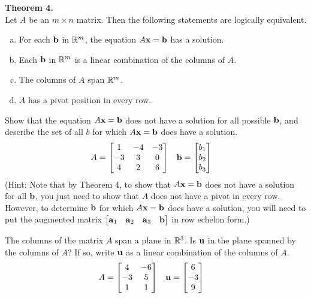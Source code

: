 \newpage


\begin{boxthm}
	\textbf{Theorem 4.} \\
	Let $A$ be an $m\times n$ matrix. Then the following statements are logically equivalent.
	\begin{enumerate}[(a)]\itemsep0em 
		\item For each $\boldsymbol{\mathbf{b}}$ in $\mathbb{R}^m$, the equation $A\boldsymbol{\mathbf{x}}=\boldsymbol{\mathbf{b}}$ has a solution.
		\item Each $\boldsymbol{\mathbf{b}}$ in $\mathbb{R}^m$ is a linear combination of the columns of $A$.
		\item The columns of $A$ span $\mathbb{R}^m$.
		\item $A$ has a pivot position in every row.
	\end{enumerate}
\end{boxthm}

\begin{exercise} %
	Show that the equation $A\boldsymbol{\mathbf{x}}=\boldsymbol{\mathbf{b}}$ does not have a solution for all possible $\boldsymbol{\mathbf{b}}$, and describe the set of all $b$ for which $A\boldsymbol{\mathbf{x}}=\boldsymbol{\mathbf{b}}$ does have a solution.
	\begin{align*}
	A &= \begin{bmatrix}1&-4&-3\\-3&3&0\\4&2&6\end{bmatrix} &
	\boldsymbol{\mathbf{b}} &= \begin{bmatrix}b_1\\b_2\\b_3\end{bmatrix}
	\end{align*}
	(Hint: Note that by Theorem 4, to show that $A\boldsymbol{\mathbf{x}}=\boldsymbol{\mathbf{b}}$ does not have a solution for all $\boldsymbol{\mathbf{b}}$, you just need to show that $A$ does not have a pivot in every row. However, to determine $\boldsymbol{\mathbf{b}}$ for which $A\boldsymbol{\mathbf{x}}=\boldsymbol{\mathbf{b}}$ does have a solution, you will need to put the augmented matrix $\begin{bmatrix}\boldsymbol{\mathbf{a}}_1&\boldsymbol{\mathbf{a}}_2&\boldsymbol{\mathbf{a}}_3&\boldsymbol{\mathbf{b}}\end{bmatrix}$ in row echelon form.)
\end{exercise}
\vfill

\begin{exercise} %
	The columns of the matrix $A$ span a plane in $\mathbb{R}^3$. Is $\boldsymbol{\mathbf{u}}$ in the plane spanned by the columns of $A$? If so, write $\boldsymbol{\mathbf{u}}$ as a linear combination of the columns of $A$.
	\begin{align*}
	A &= \begin{bmatrix}4&-6\\-3&5\\1&1\end{bmatrix} &
	\boldsymbol{\mathbf{u}} &= \begin{bmatrix}6\\-3\\9\end{bmatrix}
	\end{align*}
\end{exercise}
\vfill


